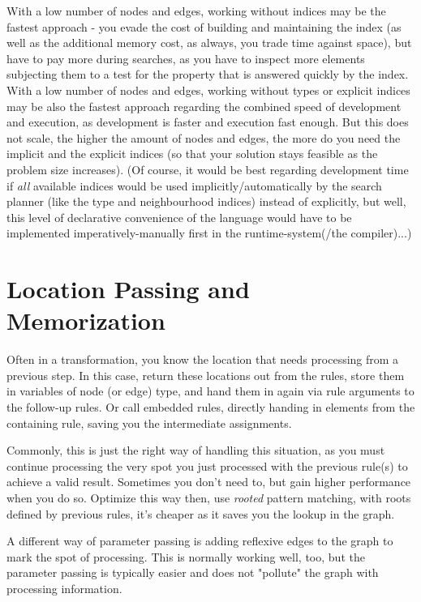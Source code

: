 With a low number of nodes and edges, working without indices may be the fastest approach - you evade the cost of building and maintaining the index (as well as the additional memory cost, as always, you trade time against space), but have to pay more during searches, as you have to inspect more elements subjecting them to a test for the property that is answered quickly by the index.
With a low number of nodes and edges, working without types or explicit indices may be also the fastest approach regarding the combined speed of development and execution, as development is faster and execution fast enough.
But this does not scale, the higher the amount of nodes and edges, the more do you need the implicit and the explicit indices (so that your solution stays feasible as the problem size increases).
(Of course, it would be best regarding development time if \emph{all} available indices would be used implicitly/automatically by the search planner (like the type and neighbourhood indices) instead of explicitly, but well, this level of declarative convenience of the language would have to be implemented imperatively-manually first in the runtime-system(/the compiler)...)

\section{Location Passing and Memorization}
Often in a transformation, you know the location that needs processing from a previous step.
In this case, return these locations out from the rules, store them in variables of node (or edge) type, and hand them in again via rule arguments to the follow-up rules.
Or call embedded rules, directly handing in elements from the containing rule, saving you the intermediate assignments.

Commonly, this is just the right way of handling this situation, 
as you must continue processing the very spot you just processed with the previous rule(s) to achieve a valid result.
Sometimes you don't need to, but gain higher performance when you do so.
Optimize this way then, use \emph{rooted} pattern matching, with roots defined by previous rules, it's cheaper as it saves you the lookup in the graph.

A different way of parameter passing is adding reflexive edges to the graph to mark the spot of processing.
This is normally working well, too, but the parameter passing is typically easier and does not "pollute" the graph with processing information.

